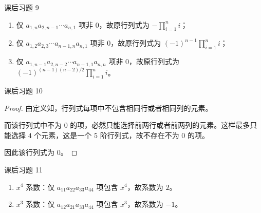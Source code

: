 \begin{problem}
	课后习题 9
	\begin{solution}
		\begin{enumerate}
			\item 仅 $a_{1,n} a_{2,n-1} \cdots a_{n,1}$ 项非 $0$，故原行列式为 $-\prod_{i=1}^n i$；
			\item 仅 $a_{1,2} a_{2,3} \cdots a_{n-1,n} a_{n,1}$ 项非 $0$，故原行列式为 $(-1)^{n-1} \prod_{i=1}^n i$；
			\item 仅 $a_{1,n-1} a_{2,n-2} \cdots a_{n-1,1} a_{n,n}$ 项非 $0$，故原行列式为 $(-1)^{(n-1)(n-2)/2} \prod_{i=1}^n i$。
		\end{enumerate}
	\end{solution}	
\end{problem}

\begin{problem}
	课后习题 10
	\begin{proof}
		由定义知，行列式每项中不包含相同行或者相同列的元素。

		而该行列式中不为 $0$ 的项，必然只能选择前两行或者前两列的元素。这样最多只能选择 $4$ 个元素，这是一个 $5$ 阶行列式，故不存在不为 $0$ 的项。

		因此该行列式为 $0$。
	\end{proof}
\end{problem}

\begin{problem}
	课后习题 11
	\begin{solution}
		\begin{enumerate}
			\item $x^4$ 系数：仅 $a_{11} a_{22} a_{33} a_{44}$ 项包含 $x^4$，故系数为 $2$。
			\item $x^3$ 系数：仅 $a_{12} a_{21} a_{33} a_{44}$ 项包含 $x^3$，故系数为 $-1$。
		\end{enumerate}
	\end{solution}
\end{problem}